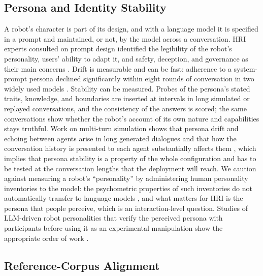\subsection{Persona and Identity Stability}
\label{sec:persona}

A robot's character is part of its design, and with a language model it is
specified in a prompt and maintained, or not, by the model across a
conversation. HRI experts consulted on prompt design identified the
legibility of the robot's personality, users' ability to adapt it, and
safety, deception, and governance as their main concerns \cite{ashok2026why}.
Drift is measurable and can be fast: adherence to a system-prompt persona
declined significantly within eight rounds of conversation in two widely
used models \cite{li2024measuring}. Stability can be measured. Probes of the persona's stated traits, knowledge,
and boundaries are inserted at intervals in long simulated or replayed
conversations, and the consistency of the answers is scored; the same
conversations show whether the robot's account of its own nature and
capabilities stays truthful. Work on multi-turn simulation shows that persona drift and echoing between
agents arise in long generated dialogues and that how the conversation
history is presented to each agent substantially affects them
\cite{luo2026spasm}, which implies
that persona stability is a property of the whole configuration and has to
be tested at the conversation lengths that the deployment will reach. We
caution against measuring a robot's ``personality'' by administering human
personality inventories to the model: the psychometric properties of such
inventories do not automatically transfer to language models
\cite{suhr2025challenging}, and what matters for HRI is the persona that
people perceive, which is an interaction-level question. Studies of
LLM-driven robot personalities that verify the perceived persona with
participants before using it as an experimental manipulation show the
appropriate order of work \cite{becker2025robots,jafari2026evaluating}.

\subsection{Reference-Corpus Alignment}
\label{sec:alignment}

